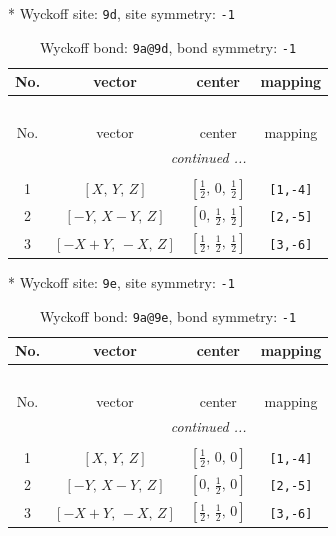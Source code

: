 \documentclass[fleqn,8pt]{jsarticle}
\begin{document}
* Wyckoff site: {\tt 9d}, site symmetry: {\tt -1}
\renewcommand{\arraystretch}{1.2}
\begin{longtable}{cccc}
\caption{Wyckoff bond: {\tt 9a@9d}, bond symmetry: {\tt -1}}
 \\
 \hline \hline
No. & vector & center & mapping \\ \hline \endfirsthead

\multicolumn{3}{l}{\tablename\ \thetable{}} \\
 \hline \hline
No. & vector & center & mapping \\ \hline \endhead

 \hline \hline
\multicolumn{3}{r}{\footnotesize\it continued ...} \\ \endfoot

 \hline \hline
\multicolumn{3}{r}{} \\ \endlastfoot

1 & $\left[ X,\, Y,\, Z \right]$ & $\left[ \frac{1}{2},\, 0,\, \frac{1}{2} \right]$ & {\tt [1,-4]} \\ \hline
2 & $\left[ - Y,\, X - Y,\, Z \right]$ & $\left[ 0,\, \frac{1}{2},\, \frac{1}{2} \right]$ & {\tt [2,-5]} \\ \hline
3 & $\left[ - X + Y,\, - X,\, Z \right]$ & $\left[ \frac{1}{2},\, \frac{1}{2},\, \frac{1}{2} \right]$ & {\tt [3,-6]} \\
\end{longtable}
* Wyckoff site: {\tt 9e}, site symmetry: {\tt -1}
\renewcommand{\arraystretch}{1.2}
\begin{longtable}{cccc}
\caption{Wyckoff bond: {\tt 9a@9e}, bond symmetry: {\tt -1}}
 \\
 \hline \hline
No. & vector & center & mapping \\ \hline \endfirsthead

\multicolumn{3}{l}{\tablename\ \thetable{}} \\
 \hline \hline
No. & vector & center & mapping \\ \hline \endhead

 \hline \hline
\multicolumn{3}{r}{\footnotesize\it continued ...} \\ \endfoot

 \hline \hline
\multicolumn{3}{r}{} \\ \endlastfoot

1 & $\left[ X,\, Y,\, Z \right]$ & $\left[ \frac{1}{2},\, 0,\, 0 \right]$ & {\tt [1,-4]} \\ \hline
2 & $\left[ - Y,\, X - Y,\, Z \right]$ & $\left[ 0,\, \frac{1}{2},\, 0 \right]$ & {\tt [2,-5]} \\ \hline
3 & $\left[ - X + Y,\, - X,\, Z \right]$ & $\left[ \frac{1}{2},\, \frac{1}{2},\, 0 \right]$ & {\tt [3,-6]} \\
\end{longtable}
\end{document}
